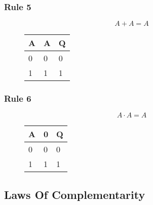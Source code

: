 \subsubsection*{Rule 5}
\begin{figure}[H]
    \begin{minipage}[t]{0.65\textwidth}
        \[A + A = A\]
    \end{minipage}\hfill
    \begin{minipage}[t]{0.25\textwidth}
        \begin{table}[H]
            \begin{tabularx}{0.5\textwidth}{XX|X}
                A & A & Q\\
                \hline
                0 & 0 & 0\\
                1 & 1 & 1\\
            \end{tabularx}
        \end{table}
    \end{minipage}\hfill
\end{figure}

\subsubsection*{Rule 6}
\begin{figure}[H]
    \begin{minipage}[t]{0.65\textwidth}
        \[A \cdot A = A\]
    \end{minipage}\hfill
    \begin{minipage}[t]{0.25\textwidth}
        \begin{table}[H]
            \begin{tabularx}{0.5\textwidth}{XX|X}
                A & 0 & Q\\
                \hline
                0 & 0 & 0\\
                1 & 1 & 1\\
            \end{tabularx}
        \end{table}
    \end{minipage}\hfill
\end{figure}

\subsection*{Laws Of Complementarity}
